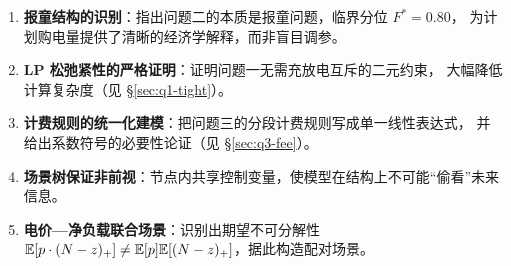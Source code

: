 \begin{enumerate}[itemsep=2pt,topsep=3pt]
  \item \textbf{报童结构的识别}：指出问题二的本质是报童问题，临界分位 $F^*=0.80$，
        为计划购电量提供了清晰的经济学解释，而非盲目调参。
  \item \textbf{LP 松弛紧性的严格证明}：证明问题一无需充放电互斥的二元约束，
        大幅降低计算复杂度（见 \S\ref{sec:q1-tight}）。
  \item \textbf{计费规则的统一化建模}：把问题三的分段计费规则写成单一线性表达式，
        并给出系数符号的必要性论证（见 \S\ref{sec:q3-fee}）。
  \item \textbf{场景树保证非前视}：节点内共享控制变量，使模型在结构上不可能“偷看”未来信息。
  \item \textbf{电价—净负载联合场景}：识别出期望不可分解性
        $\mathbb{E}[p\cdot(N-z)_+]\neq\mathbb{E}[p]\mathbb{E}[(N-z)_+]$，据此构造配对场景。
\end{enumerate}

